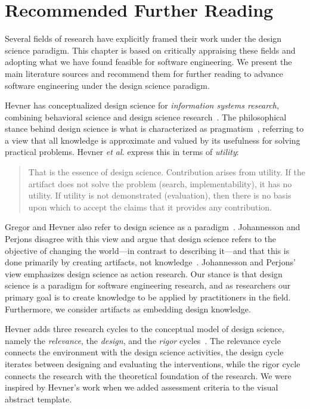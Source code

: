 \documentclass[graybox]{svmult}
\newcommand{\peggy}[1]{\textcolor{blue}{{\it [Peggy says: #1]}}}
\newcommand{\peggy}[1]{}
\begin{document}
\section{Recommended Further Reading}
\label{sec:reading}
Several fields of research have explicitly framed their work under the design science paradigm. This chapter is based on critically appraising these fields and adopting what we have found feasible for software engineering. We present the main literature sources and recommend them for further reading to advance software engineering under the design science paradigm.

Hevner has conceptualized design science for \emph{information systems research}, combining behavioral science and design science research~\cite{hevner_design_2004,hevner_design_2010}.
The philosophical stance behind design science is what is characterized as pragmatism~\cite{easterbrook_selecting_2008}, referring to a view that all knowledge is approximate and valued by its usefulness for solving practical problems. Hevner \emph{et al.} express this in terms of \emph{utility}: 

\begin{quote}
	That is the essence of design science. Contribution arises from utility. If the artifact does not solve the problem (search, implementability), it has no utility. If utility is not demonstrated (evaluation), then there is no basis upon which to accept the claims that it provides any contribution.~\cite{hevner_design_2004}
\end{quote}


Gregor and Hevner also refer to design science as a paradigm~\cite{gregor_positioning_2013}. Johannesson and Perjons  disagree with this view and argue that design science refers to the objective of changing the world---in contrast to describing it---and that this is done primarily by creating artifacts, not knowledge~\cite{johannesson_introduction_2014}. Johannesson and Perjons' view emphasizes design science as action research. Our stance is that design science is a paradigm for software engineering research, and as researchers our primary goal is to create knowledge to be applied by practitioners in the field. Furthermore, we consider artifacts as embedding design knowledge. 

Hevner adds three research cycles to the conceptual model of design science, namely the \emph{relevance}, the \emph{design}, and the \emph{rigor} cycles~\cite{Hevner2007}. The relevance cycle connects the environment with the design science activities, the design cycle iterates between designing and evaluating the interventions, while the rigor cycle connects the research with the theoretical foundation of the research. We were inspired by Hevner's work when we added assessment criteria to the visual abstract template.
\end{document}
